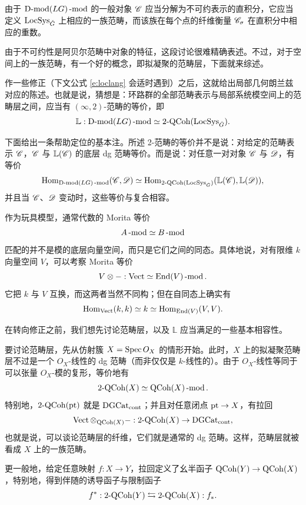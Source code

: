 由于 $\Dmod(LG)\mod$ 的一般对象 $\sC$ 应当分解为不可约表示的直积分，它应当定义 $\LS$ 上相应的一族范畴，而该族在每个点的纤维衡量 $\sC_{\sigma}$ 在直积分中相应的重数。

由于不可约性是阿贝尔范畴中对象的特征，这段讨论很难精确表述。不过，对于空间上的一族范畴，有一个好的概念，即拟凝聚的范畴层，下面就来综述。

作一些修正（下文公式 \eqref{e:loclang} 会适时遇到）之后，这就给出局部几何朗兰兹对应的陈述。也就是说，猜想是：环路群的全部范畴表示与局部系统模空间上的范畴层之间，应当有 $(\infty,2)$-范畴的等价，即
%
\begin{equation}
\label{e:loclangnaive}       \mathbb{L}: \Dmod(LG)\mod \simeq
\on{2-QCoh}(\LS).
\end{equation}
%



下面给出一条帮助定位的基本注。所述 2-范畴的等价并不是说：对给定的范畴表示 $\sC$，$\sC$ 与 $\mathbb{L}(\sC)$ 的底层 dg 范畴等价。而是说：对任意一对对象 $\sC$ 与 $\sD$，有等价
%
\[
         \Hom_{\Dmod(LG)\mod}(\sC, \sD) \simeq
         \Hom_{\TwoCoh(\LS)}(\mathbb{L}(\sC), \mathbb{L}(\sD)),
\]
%
并且当 $\sC$、$\sD$ 变动时，这些等价与复合相容。

\begin{re}  作为玩具模型，通常代数的 Morita 等价
    \[
        A\mod \simeq B\mod
    \]
	匹配的并不是模的底层向量空间，而只是它们之间的同态。具体地说，对有限维 $k$ 向量空间 $V$，可以考察 Morita 等价
	\[
	   V \otimes -  :\Vect \simeq  \End(V)\mod.
	\]
	它把 $k$ 与 $V$ 互换，而这两者当然不同构；但在自同态上确实有
	\[
	     \Hom_{\Vect}(k, k) \simeq k \simeq \Hom_{\End(V)}(V,V).
	\]
		\end{re}


在转向修正之前，我们想先讨论范畴层，以及 $\mathbb{L}$ 应当满足的一些基本相容性。

\ssszh   要讨论范畴层，先从仿射簇 $X = \on{Spec }O_X$ 的情形开始。此时，$X$ 上的拟凝聚范畴层不过是一个 $O_X$-线性的 dg 范畴（而非仅仅是 $k$-线性的）。由于 $O_X$-线性等同于可以张量 $O_X$-模的复形，等价地有
%
\[
	  \TwoCoh(X) \simeq \QCoh(X)\mod.
\]
%
特别地，$\TwoCoh(\on{pt})$ 就是 $\DGCat$；并且对任意闭点 $\on{pt} \rightarrow X$，有拉回
%
\[
	  \Vect \otimes_{\QCoh(X)}  -: \TwoCoh(X) \rightarrow \DGCat,
\]
%
也就是说，可以谈论范畴层的纤维，它们就是通常的 dg 范畴。这样，范畴层就被看成 $X$ 上的一族范畴。



\begin{re}\label{r:pushpull2coh} 更一般地，给定任意映射 $f: X \rightarrow Y$，拉回定义了幺半函子 $\QCoh(Y) \rightarrow \QCoh(X)$，特别地，得到伴随的诱导函子与限制函子
	\[
	    f^*: \TwoCoh(Y) \leftrightarrows \TwoCoh(X): f_*.
	\]
\end{re}





